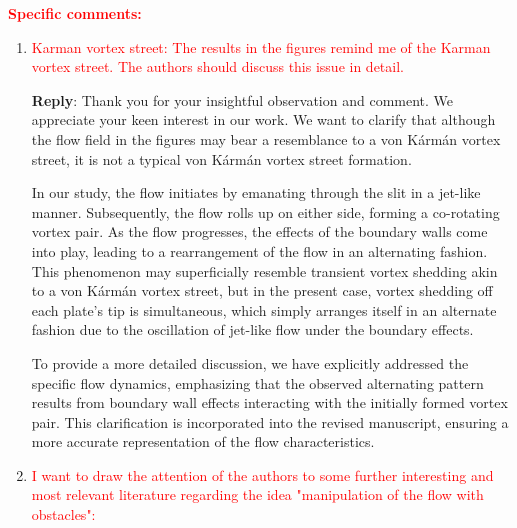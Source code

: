 \documentclass[onecolumn,a4paper,amsmath,amssym,pre]{revtex4}
\begin{document}
				\textcolor{red}{\textbf{Specific comments:}}\\
				
				\begin{enumerate}
					\item \textcolor{red}{Karman vortex street:
						The results in the figures remind me of the Karman vortex street. The authors should discuss this issue in detail.}
					
					\textbf{Reply}: Thank you for your insightful observation and comment. We appreciate your keen interest in our work. We want to clarify that although the flow field in the figures may bear a resemblance to a von Kármán vortex street, it is not a typical von Kármán vortex street formation.
					
					In our study, the flow initiates by emanating through the slit in a jet-like manner. Subsequently, the flow rolls up on either side, forming a co-rotating vortex pair. As the flow progresses, the effects of the boundary walls come into play, leading to a rearrangement of the flow in an alternating fashion. This phenomenon may superficially resemble transient vortex shedding akin to a von Kármán vortex street, but in the present case, vortex shedding off each plate's tip is simultaneous, which simply arranges itself in an alternate fashion due to the oscillation of jet-like flow under the boundary effects.
					
					To provide a more detailed discussion, we have explicitly addressed the specific flow dynamics, emphasizing that the observed alternating pattern results from boundary wall effects interacting with the initially formed vortex pair. This clarification is incorporated into the revised manuscript, ensuring a more accurate representation of the flow characteristics.
					
					\item \textcolor{red}{I want to draw the attention of the authors to some further interesting and most relevant literature regarding the idea "manipulation of the flow with obstacles":}
					
					\begin{enumerate}
						\color{red}{	\item Manipulation of the flow in channels:
							Massive stabilization of gravity-driven film flows with corrugated side walls.
							
							Kögel, A and Aksel, N,
							Nov 2018 PoF
							30 (11)
							
							\item  Stability of the channel flow - new phenomena in an old problem.
							
}
\end{enumerate}
\end{enumerate}
\end{document}
